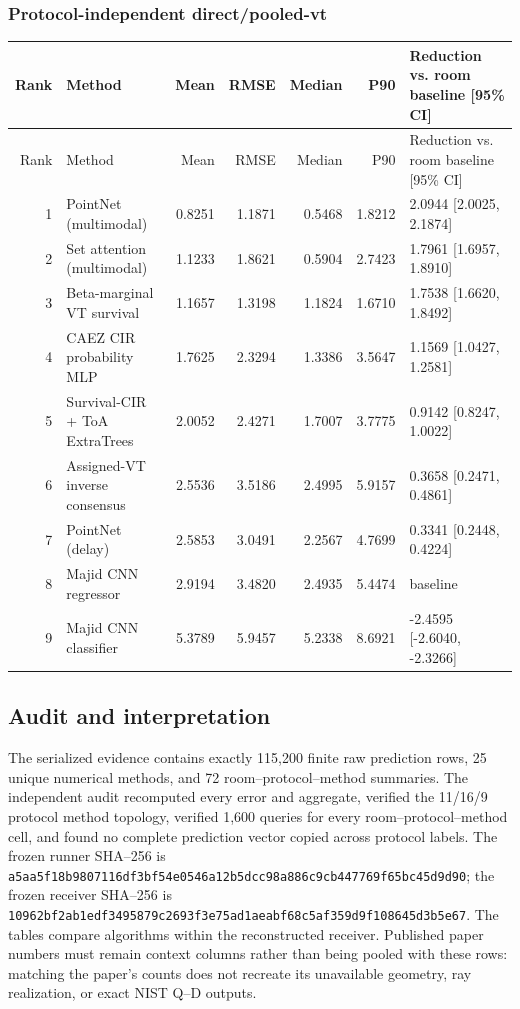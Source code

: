 \subsubsection{Protocol-independent direct/pooled-vt}
\begingroup\scriptsize\setlength{\tabcolsep}{3.2pt}
\begin{longtable}{@{}r p{.28\linewidth} r r r r p{.23\linewidth}@{}}
\toprule Rank & Method & Mean & RMSE & Median & P90 & Reduction vs. room baseline [95\% CI] \\
\midrule\endfirsthead
\toprule Rank & Method & Mean & RMSE & Median & P90 & Reduction vs. room baseline [95\% CI] \\
\midrule\endhead
1 & PointNet (multimodal) & 0.8251 & 1.1871 & 0.5468 & 1.8212 & 2.0944 [2.0025, 2.1874] \\
2 & Set attention (multimodal) & 1.1233 & 1.8621 & 0.5904 & 2.7423 & 1.7961 [1.6957, 1.8910] \\
3 & Beta-marginal VT survival & 1.1657 & 1.3198 & 1.1824 & 1.6710 & 1.7538 [1.6620, 1.8492] \\
4 & CAEZ CIR probability MLP & 1.7625 & 2.3294 & 1.3386 & 3.5647 & 1.1569 [1.0427, 1.2581] \\
5 & Survival-CIR + ToA ExtraTrees & 2.0052 & 2.4271 & 1.7007 & 3.7775 & 0.9142 [0.8247, 1.0022] \\
6 & Assigned-VT inverse consensus & 2.5536 & 3.5186 & 2.4995 & 5.9157 & 0.3658 [0.2471, 0.4861] \\
7 & PointNet (delay) & 2.5853 & 3.0491 & 2.2567 & 4.7699 & 0.3341 [0.2448, 0.4224] \\
8 & Majid CNN regressor & 2.9194 & 3.4820 & 2.4935 & 5.4474 & baseline \\
9 & Majid CNN classifier & 5.3789 & 5.9457 & 5.2338 & 8.6921 & -2.4595 [-2.6040, -2.3266] \\
\bottomrule
\end{longtable}\endgroup
\subsection{Audit and interpretation}
The serialized evidence contains exactly 115,200 finite raw prediction rows, 25 unique numerical methods, and 72 room--protocol--method summaries. The independent audit recomputed every error and aggregate, verified the 11/16/9 protocol method topology, verified 1,600 queries for every room--protocol--method cell, and found no complete prediction vector copied across protocol labels. The frozen runner SHA--256 is \texttt{a5aa5f18b9807116df3bf54e0546a12b5dcc98a886c9cb447769f65bc45d9d90}; the frozen receiver SHA--256 is \texttt{10962bf2ab1edf3495879c2693f3e75ad1aeabf68c5af359d9f108645d3b5e67}.
The tables compare algorithms within the reconstructed receiver. Published paper numbers must remain context columns rather than being pooled with these rows: matching the paper's counts does not recreate its unavailable geometry, ray realization, or exact NIST Q--D outputs.
